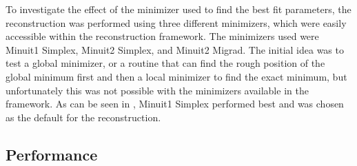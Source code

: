 To investigate the effect of the minimizer used to find the best fit parameters, the reconstruction was performed using three different minimizers, which were easily accessible within the reconstruction framework. The minimizers used were Minuit1 Simplex, Minuit2 Simplex, and Minuit2 Migrad. The initial idea was to test a global minimizer, or a routine that can find the rough position of the global minimum first and then a local minimizer to find the exact minimum, but unfortunately this was not possible with the minimizers available in the framework. As can be seen in , Minuit1 Simplex performed best and was chosen as the default for the reconstruction.




\subsection{Performance}


